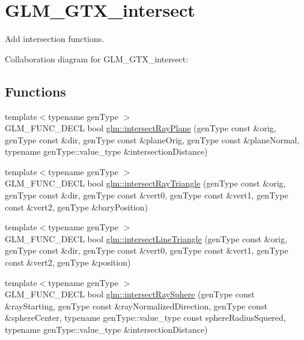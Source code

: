 \hypertarget{group__gtx__intersect}{\section{G\-L\-M\-\_\-\-G\-T\-X\-\_\-intersect}
\label{group__gtx__intersect}
}


Add intersection functions.  


Collaboration diagram for G\-L\-M\-\_\-\-G\-T\-X\-\_\-intersect\-:
\subsection*{Functions}
\begin{DoxyCompactItemize}
\item 
{\footnotesize template$<$typename gen\-Type $>$ }\\G\-L\-M\-\_\-\-F\-U\-N\-C\-\_\-\-D\-E\-C\-L bool \hyperlink{group__gtx__intersect_gad3697a9700ea379739a667ea02573488}{glm\-::intersect\-Ray\-Plane} (gen\-Type const \&orig, gen\-Type const \&dir, gen\-Type const \&plane\-Orig, gen\-Type const \&plane\-Normal, typename gen\-Type\-::value\-\_\-type \&intersection\-Distance)
\item 
{\footnotesize template$<$typename gen\-Type $>$ }\\G\-L\-M\-\_\-\-F\-U\-N\-C\-\_\-\-D\-E\-C\-L bool \hyperlink{group__gtx__intersect_gab16c1b47c10451e7604b51b39a7ef21d}{glm\-::intersect\-Ray\-Triangle} (gen\-Type const \&orig, gen\-Type const \&dir, gen\-Type const \&vert0, gen\-Type const \&vert1, gen\-Type const \&vert2, gen\-Type \&bary\-Position)
\item 
{\footnotesize template$<$typename gen\-Type $>$ }\\G\-L\-M\-\_\-\-F\-U\-N\-C\-\_\-\-D\-E\-C\-L bool \hyperlink{group__gtx__intersect_ga9d29b9b3acb504d43986502f42740df4}{glm\-::intersect\-Line\-Triangle} (gen\-Type const \&orig, gen\-Type const \&dir, gen\-Type const \&vert0, gen\-Type const \&vert1, gen\-Type const \&vert2, gen\-Type \&position)
\item 
{\footnotesize template$<$typename gen\-Type $>$ }\\G\-L\-M\-\_\-\-F\-U\-N\-C\-\_\-\-D\-E\-C\-L bool \hyperlink{group__gtx__intersect_gac88f8cd84c4bcb5b947d56acbbcfa56e}{glm\-::intersect\-Ray\-Sphere} (gen\-Type const \&ray\-Starting, gen\-Type const \&ray\-Normalized\-Direction, gen\-Type const \&sphere\-Center, typename gen\-Type\-::value\-\_\-type const sphere\-Radius\-Squered, typename gen\-Type\-::value\-\_\-type \&intersection\-Distance)

\end{DoxyCompactItemize}
